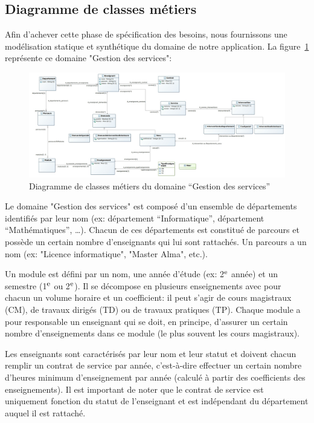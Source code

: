 \begin{ocl}
 \section{Diagramme de classes métiers}
Afin d'achever cette phase de spécification des besoins, nous fournissons une modélisation statique et synthétique du domaine de notre application. La figure~\ref{cls-metier} représente ce domaine "Gestion des services": 

 \begin{figure}[!htb]
 \centering
 \includegraphics[width=\linewidth] {CD-Gestion Services.jpg}
 \caption{Diagramme de classes métiers du domaine ``Gestion des services''}
 \label{cls-metier}
 \end{figure}

Le domaine "Gestion des services" est composé d'un ensemble de départements identifiés par leur nom (ex: département ``Informatique'', département ``Mathématiques'', \dots). 
Chacun de ces départements est constitué de parcours et possède un certain nombre d'enseignants qui lui sont rattachés.
Un parcours a un nom (ex: "Licence informatique", "Master Alma", etc.).

 Un module est défini par un nom, une année d'étude (ex: 2$^{\textrm{\footnotesize{e}}}$ année) et un semestre (1$^{\textrm{\footnotesize{e}}}$ ou 2$^{\textrm{\footnotesize{e}}}$). Il se décompose en plusieurs enseignements avec pour chacun un volume horaire et un coefficient: il peut s'agir de cours magistraux (CM), de travaux dirigés (TD) ou de travaux pratiques (TP). 
Chaque module a pour responsable un enseignant qui se doit, en principe, d'assurer un certain nombre d'enseignements dans ce module (le plus souvent les cours magistraux).

 Les enseignants sont caractérisés par leur nom et leur statut et doivent chacun remplir un contrat de service par année, c'est-à-dire effectuer un certain nombre d'heures minimum d'enseignement par année (calculé à partir des coefficients des enseignements). Il est important de noter que le contrat de service est uniquement fonction du statut de l'enseignant et est indépendant du département auquel il est rattaché.


\end{ocl}

